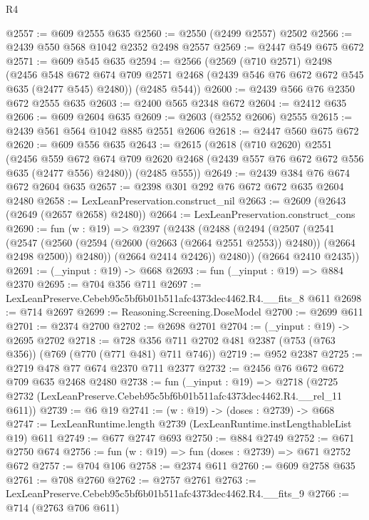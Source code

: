 \begin{lexlean}{R4}
\begin{coremodule}
@2557 := @609 @2555 @635
@2560 := @2550 (@2499 @2557) @2502
@2566 := @2439 @550 @568 @1042 @2352 @2498 @2557
@2569 := @2447 @549 @675 @672
@2571 := @609 @545 @635
@2594 := @2566
    (@2569
      (@710 @2571)
      @2498
      (@2456
        @548
        @672
        @674
        @709
        @2571
        @2468
        (@2439 @546 @76 @672 @672 @545 @635 (@2477 @545) @2480))
      (@2485 @544))
@2600 := @2439 @566 @76 @2350 @672 @2555 @635
@2603 := @2400 @565 @2348 @672
@2604 := @2412 @635
@2606 := @609 @2604 @635
@2609 := @2603 (@2552 @2606) @2555
@2615 := @2439 @561 @564 @1042 @885 @2551 @2606
@2618 := @2447 @560 @675 @672
@2620 := @609 @556 @635
@2643 := @2615
    (@2618
      (@710 @2620)
      @2551
      (@2456
        @559
        @672
        @674
        @709
        @2620
        @2468
        (@2439 @557 @76 @672 @672 @556 @635 (@2477 @556) @2480))
      (@2485 @555))
@2649 := @2439 @384 @76 @674 @672 @2604 @635
@2657 := @2398 @301 @292 @76 @672 @672 @635 @2604 @2480
@2658 := LexLeanPreservation.construct_nil
@2663 := @2609 (@2643 (@2649 (@2657 @2658) @2480))
@2664 := LexLeanPreservation.construct_cons
@2690 := fun (w : @19) =>
  @2397
    (@2438
      (@2488
        (@2494
          (@2507
            (@2541
              (@2547
                (@2560 (@2594 (@2600 (@2663 (@2664 @2551 @2553)) @2480)) (@2664 @2498 @2500))
                @2480))
            (@2664 @2414 @2426))
          @2480))
      (@2664 @2410 @2435))
@2691 := (_yinput : @19) -> @668
@2693 := fun (_yinput : @19) => @884 @2370
@2695 := @704 @356 @711
@2697 := LexLeanPreserve.Cebeb95c5bf6b01b511afc4373dec4462.R4.__fits_8 @611
@2698 := @714 @2697
@2699 := Reasoning.Screening.DoseModel
@2700 := @2699 @611
@2701 := @2374 @2700
@2702 := @2698 @2701
@2704 := (_yinput : @19) -> @2695 @2702
@2718 := @728 @356 @711 @2702 @481 @2387 (@753 (@763 @356)) (@769 (@770 (@771 @481) @711 @746))
@2719 := @952 @2387
@2725 := @2719 @478 @77 @674 @2370 @711 @2377
@2732 := @2456 @76 @672 @672 @709 @635 @2468 @2480
@2738 := fun (_yinput : @19) =>
  @2718 (@2725 @2732 (LexLeanPreserve.Cebeb95c5bf6b01b511afc4373dec4462.R4.__rel_11 @611))
@2739 := @6 @19
@2741 := (w : @19) -> (doses : @2739) -> @668
@2747 := LexLeanRuntime.length @2739 (LexLeanRuntime.instLengthableList @19) @611
@2749 := @677 @2747 @693
@2750 := @884 @2749
@2752 := @671 @2750 @674
@2756 := fun (w : @19) => fun (doses : @2739) => @671 @2752 @672
@2757 := @704 @106
@2758 := @2374 @611
@2760 := @609 @2758 @635
@2761 := @708 @2760
@2762 := @2757 @2761
@2763 := LexLeanPreserve.Cebeb95c5bf6b01b511afc4373dec4462.R4.__fits_9
@2766 := @714 (@2763 @706 @611)

\end{coremodule}
\end{lexlean}
